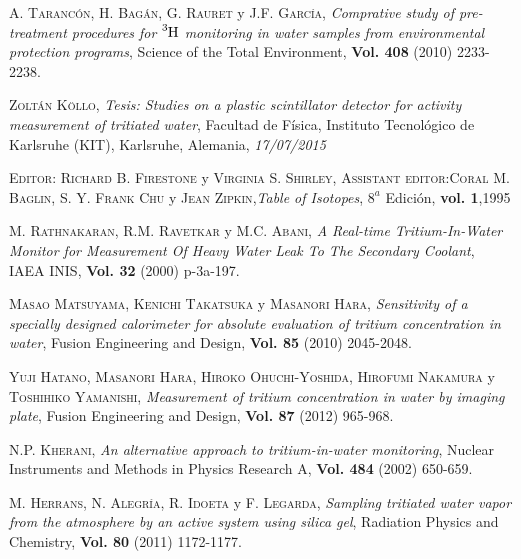 \begin{thebibliography}{99}
 \textsc{A. Tarancón}, \textsc{H. Bagán}, \textsc{G. Rauret} y \textsc{J.F. García},
\textit{Comprative study of pre-treatment procedures for $\ce{^{3}H}$ monitoring in water samples from environmental protection programs}, Science of the Total Environment, \textbf{Vol. 408} (2010) 2233-2238.

 \textsc{Zoltán Köllo},
\textit{Tesis: Studies on a plastic scintillator detector for activity measurement of tritiated water}, Facultad de Física, Instituto Tecnológico de Karlsruhe (KIT), Karlsruhe, Alemania, \textit{17/07/2015}

 \textsc{Editor:} \textsc{Richard B. Firestone} y \textsc{Virginia S. Shirley}, \textsc{Assistant editor:}\textsc{Coral M. Baglin}, \textsc{S. Y. Frank Chu} y \textsc{Jean Zipkin},\textit{Table of Isotopes},  $8^a$ Edición, \textbf{vol. 1},1995 


 \textsc{M. Rathnakaran}, \textsc{R.M. Ravetkar} y \textsc{M.C. Abani},
\textit{A Real-time Tritium-In-Water Monitor for Measurement Of Heavy Water Leak To The Secondary Coolant}, \textsc{IAEA INIS}, \textbf{Vol. 32} (2000) p-3a-197.

 \textsc{Masao Matsuyama}, \textsc{Kenichi Takatsuka} y \textsc{Masanori Hara}, 
\textit{Sensitivity of a specially designed calorimeter for absolute evaluation of tritium concentration in water}, Fusion Engineering and Design, \textbf{Vol. 85} (2010) 2045-2048.

 \textsc{Yuji Hatano}, \textsc{Masanori Hara}, \textsc{Hiroko Ohuchi-Yoshida}, \textsc{Hirofumi Nakamura} y \textsc{Toshihiko Yamanishi},
\textit{Measurement of tritium concentration in water by imaging plate}, Fusion Engineering and Design, \textbf{Vol. 87} (2012) 965-968.

\textsc{N.P. Kherani},
\textit{An alternative approach to tritium-in-water monitoring}, Nuclear Instruments and Methods in Physics Research A, \textbf{Vol. 484} (2002) 650-659.

 \textsc{M. Herrans}, \textsc{N. Alegría}, \textsc{R. Idoeta} y \textsc{F. Legarda},
\textit{Sampling tritiated water vapor from the atmosphere by an active system using silica gel}, Radiation Physics and Chemistry, \textbf{Vol. 80} (2011) 1172-1177.


\end{thebibliography}
